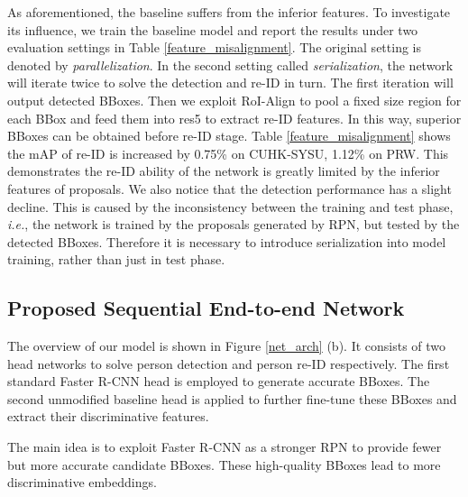 \documentclass[letterpaper]{article} \usepackage{aaai21}  \usepackage{times}  \usepackage{helvet} \usepackage{courier}  \usepackage[hyphens]{url}  \usepackage{graphicx} \urlstyle{rm} \def\UrlFont{\rm}  \usepackage{natbib}  \usepackage{caption} \usepackage{multirow}
\begin{document}
As aforementioned, the baseline suffers from the inferior features. To investigate its influence, we train the baseline model and report the results under two evaluation settings in Table \ref{feature_misalignment}. The original setting is denoted by \textit{parallelization}. In the second setting called \textit{serialization}, the network will iterate twice to solve the detection and re-ID in turn. The first iteration will output detected BBoxes. Then we exploit RoI-Align to pool a fixed size region for each BBox and feed them into res5 to extract re-ID features. In this way, superior BBoxes can be obtained before re-ID stage. Table \ref{feature_misalignment} shows the mAP of re-ID is increased by 0.75\% on CUHK-SYSU, 1.12\% on PRW. This demonstrates the re-ID ability of the network is greatly limited by the inferior features of proposals. We also notice that the detection performance has a slight decline. This is caused by the inconsistency between the training and test phase, \textit{i.e.}, the network is trained by the proposals generated by RPN, but tested by the detected BBoxes. Therefore it is necessary to introduce serialization into model training, rather than just in test phase.

\subsection{Proposed Sequential End-to-end Network}
The overview of our model is shown in Figure \ref{net_arch} (b). It consists of two head networks to solve person detection and person re-ID respectively. The first standard Faster R-CNN head is employed to generate accurate BBoxes. The second unmodified baseline head is applied to further fine-tune these BBoxes and extract their discriminative features.

The main idea is to exploit Faster R-CNN as a stronger RPN to provide fewer but more accurate candidate BBoxes. These high-quality BBoxes lead to more discriminative embeddings.
\end{document}

